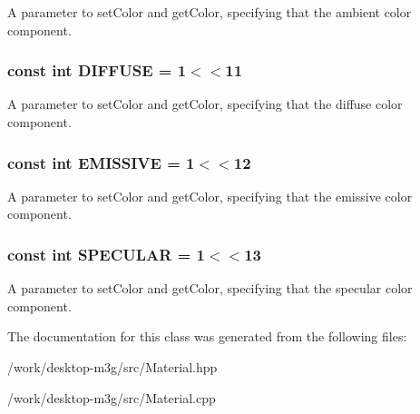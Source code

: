A parameter to setColor and getColor, specifying that the ambient color component. \hypertarget{classm3g_1_1Material_9798073e44254569f47464dc6bf5da89}{
\subsubsection[{DIFFUSE}]{\setlength{\rightskip}{0pt plus 5cm}const int {\bf DIFFUSE} = 1$<$$<$11}}
\label{classm3g_1_1Material_9798073e44254569f47464dc6bf5da89}


A parameter to setColor and getColor, specifying that the diffuse color component. \hypertarget{classm3g_1_1Material_b92d57adf6955eae6adac15e865659cd}{
\subsubsection[{EMISSIVE}]{\setlength{\rightskip}{0pt plus 5cm}const int {\bf EMISSIVE} = 1$<$$<$12}}
\label{classm3g_1_1Material_b92d57adf6955eae6adac15e865659cd}


A parameter to setColor and getColor, specifying that the emissive color component. \hypertarget{classm3g_1_1Material_cac20b25665d9a3713bec3a772a89ede}{
\subsubsection[{SPECULAR}]{\setlength{\rightskip}{0pt plus 5cm}const int {\bf SPECULAR} = 1$<$$<$13}}
\label{classm3g_1_1Material_cac20b25665d9a3713bec3a772a89ede}


A parameter to setColor and getColor, specifying that the specular color component. 

The documentation for this class was generated from the following files:\begin{CompactItemize}
\item 
/work/desktop-m3g/src/Material.hpp\item 
/work/desktop-m3g/src/Material.cpp\end{CompactItemize}
